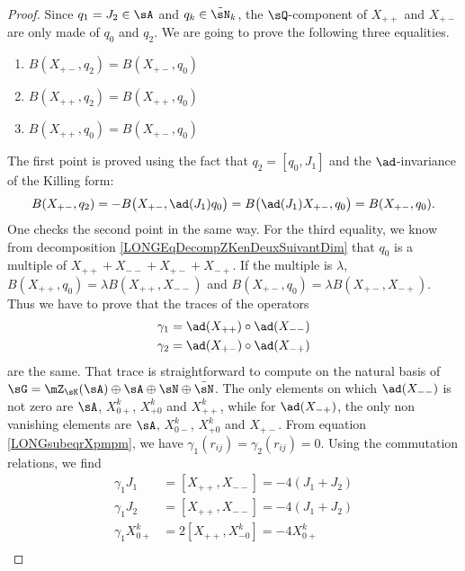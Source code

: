 \begin{proof}
	Since $q_1=J_2\in\sA$ and $q_k\in\tilde\sN_k$, the $\sQ$-component of $X_{++}$ and $X_{+-}$ are only made of $q_0$ and $q_2$.
	We are	going to prove the following three equalities.
	\begin{enumerate}

		\item\label{LONGItemBpmqDeux}
			$B(X_{+-},q_2)=B(X_{+-},q_0)$
		\item
			$B(X_{++},q_2)=B(X_{++},q_0)$
		\item
			$B(X_{++},q_0)=B(X_{+-},q_0)$
	\end{enumerate}
	
	The first point is proved using the fact that $q_2=[q_0,J_1]$ and the $\ad$-invariance of the Killing form:
	\begin{equation}
		B(X_{+-},q_2)=-B\big( X_{+-},\ad(J_1)q_0 \big)=B\big( \ad(J_1)X_{+-},q_0 \big)=B(X_{+-},q_0).
	\end{equation}
	One checks the second point in the same way. For the third equality, we know from decomposition \eqref{LONGEqDecompZKenDeuxSuivantDim} that $q_0$ is a multiple of $X_{++}+X_{--}+X_{+-}+X_{-+}$. If the multiple is $\lambda$, $B(X_{++},q_0)=\lambda B(X_{++},X_{--})$ and $B(X_{+-},q_0)=\lambda B(X_{+-},X_{-+})$. Thus we have to prove that the traces of the operators
	\begin{equation}
		\begin{aligned}[]
			\gamma_1&=\ad(X_{++})\circ\ad(X_{--})\\
			\gamma_2&=\ad(X_{+-})\circ\ad(X_{-+})
		\end{aligned}
	\end{equation}
	are the same. That trace is straightforward to compute on the natural basis of $\sG=\mZ_{\sK}(\sA)\oplus\sA\oplus\sN\oplus\bar\sN$. 
	The only elements on which $\ad(X_{--})$ is not zero are $\sA$, $X^k_{0+}$, $X^k_{+0}$ and $X^k_{++}$, while for $\ad(X_{-+})$, the only non vanishing elements are $\sA$, $X^k_{0-}$, $X^k_{+0}$ and $X_{+-}$. From equation \eqref{LONGsubeqrXpmpm}, we have $\gamma_1(r_{ij})=\gamma_2(r_{ij})=0$. Using the commutation relations, we find
	\begin{subequations}
		\begin{align}
			\gamma_1J_1&=[X_{++},X_{--}]=-4(J_1+J_2) \\
			\gamma_1J_2&=[X_{++},X_{--}]=-4(J_1+J_2) \\
			\gamma_1X^k_{0+}&=2[X_{++},X^k_{-0}]=-4X^k_{0+} \\

\end{align}
\end{subequations}
\end{proof}
